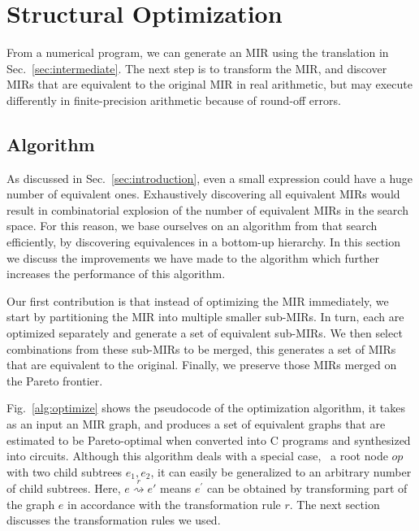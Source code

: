 \section{Structural Optimization}
\label{sec:structural_optimization}

From a numerical program, we can generate an MIR using the translation in
Sec.~\ref{sec:intermediate}.  The next step is to transform the MIR, and
discover MIRs that are equivalent to the original MIR in real arithmetic, but
may execute differently in finite-precision arithmetic because of round-off
errors.

\subsection{Algorithm}
\label{sub:algorithm}


As discussed in Sec.~\ref{sec:introduction}, even a small expression could have
a huge number of equivalent ones.  Exhaustively discovering all equivalent MIRs
would result in combinatorial explosion of the number of equivalent MIRs in the
search space.  For this reason, we base ourselves on an algorithm from \SOAP{}
that search efficiently, by discovering equivalences in a bottom-up hierarchy.
In this section we discuss the improvements we have made to the algorithm which
further increases the performance of this algorithm.

Our first contribution is that instead of optimizing the MIR immediately, we
start by partitioning the MIR into multiple smaller sub-MIRs.  In turn, each
are optimized separately and generate a set of equivalent sub-MIRs.  We then
select combinations from these sub-MIRs to be merged, this generates a set of
MIRs that are equivalent to the original.  Finally, we preserve those MIRs
merged on the Pareto frontier.

Fig.~\ref{alg:optimize} shows the pseudocode of the optimization algorithm,
it takes as an input an MIR graph, and produces a set of equivalent graphs
that are estimated to be Pareto-optimal when converted into C programs and
synthesized into circuits.  Although this algorithm deals with a special
case, \ie~a root node $op$ with two child subtrees $e_1, e_2$, it can
easily be generalized to an arbitrary number of child subtrees.  Here, $e
\stackrel{r}{\rightsquigarrow} e'$ means $e^\prime$ can be obtained by
transforming part of the graph $e$ in accordance with the transformation rule
$r$.  The next section discusses the transformation rules we used.


